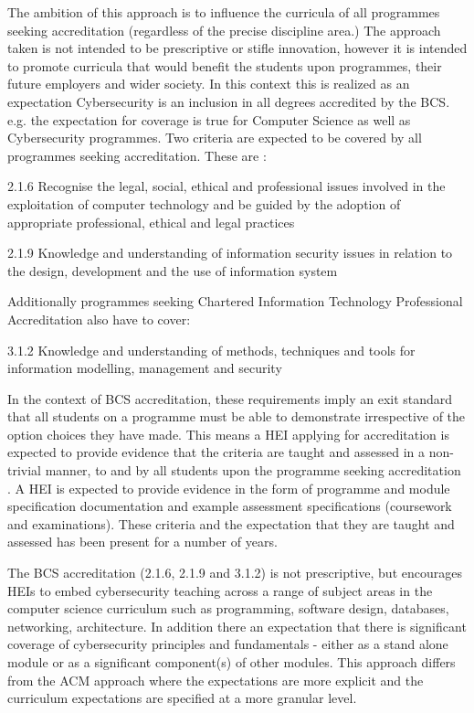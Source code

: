 \documentclass[sigconf,anonymous]{acmart}
\begin{document}
The ambition of this approach is to influence the curricula of all programmes seeking accreditation (regardless of the precise discipline area.)  The approach taken is not intended to be prescriptive or stifle innovation, however it is intended to promote curricula that would benefit the students upon programmes, their future employers and wider society.  In this context this is realized as an expectation Cybersecurity is an inclusion in all degrees accredited by the BCS. e.g. the expectation for coverage is true for Computer Science as well as Cybersecurity programmes. Two criteria are expected to be covered by all programmes seeking accreditation. These are \cite{BCS2018a}:

2.1.6 Recognise the legal, social, ethical and professional issues involved in the exploitation of computer technology and be guided by the adoption of appropriate professional, ethical and legal practices

2.1.9 Knowledge and understanding of information security issues in relation to the design, development and the use of information system

Additionally programmes seeking Chartered Information Technology Professional Accreditation also have to cover:

3.1.2 Knowledge and understanding of methods, techniques and tools for information modelling, management and security

In the context of BCS accreditation, these requirements imply an exit standard that all students on a programme must be able to demonstrate irrespective of the option choices they have made. This means a HEI applying for accreditation is expected to provide evidence that the criteria are taught and assessed in a non-trivial manner, to and by all students upon the programme seeking accreditation . A HEI is expected to provide evidence in the form of programme and module specification documentation and example assessment specifications (coursework and examinations). These criteria and the expectation that they are taught and assessed has been present for a number of years.

The BCS accreditation (2.1.6, 2.1.9 and 3.1.2) is not prescriptive, but encourages HEIs to embed cybersecurity teaching across a range of subject areas in the computer science curriculum such as programming, software design, databases, networking, architecture. In addition there an expectation that there is significant coverage of cybersecurity principles and fundamentals - either as a stand alone module or as a significant component(s) of other modules. This approach differs from the ACM approach where the expectations are more explicit and the curriculum expectations are specified at a more granular level.
\end{document}
